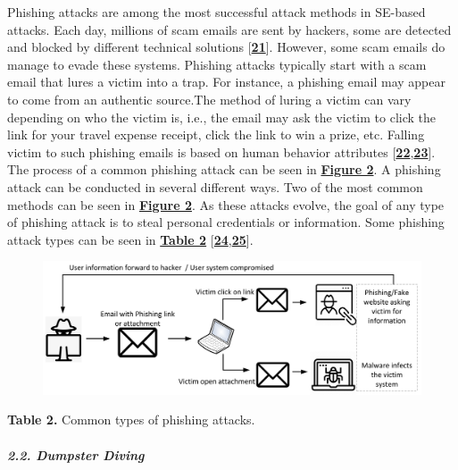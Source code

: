 Phishing attacks are among the most successful attack methods in SE-based attacks. Each day, millions of scam emails are sent by hackers, some are detected and blocked by different technical solutions [\href{https://www.mdpi.com/2076-3417/12/12/6042\#B21-applsci-12-06042}{\textbf{21}}]. However, some scam emails do manage to evade these systems. Phishing attacks typically start with a scam email that lures a victim into a trap. For instance, a phishing email may appear to come from an authentic source.The method of luring a victim can vary depending on who the victim is, i.e., the email may ask the victim to click the link for your travel expense receipt, click the link to win a prize, etc. Falling victim to such phishing emails is based on human behavior attributes [\href{https://www.mdpi.com/2076-3417/12/12/6042\#B22-applsci-12-06042}{\textbf{22}},\href{https://www.mdpi.com/2076-3417/12/12/6042\#B23-applsci-12-06042}{\textbf{23}}]. The process of a common phishing attack can be seen in \href{https://www.mdpi.com/2076-3417/12/12/6042\#fig_body_display_applsci-12-06042-f002}{\textbf{Figure 2}}. A phishing attack can be conducted in several different ways. Two of the most common methods can be seen in \href{https://www.mdpi.com/2076-3417/12/12/6042\#fig_body_display_applsci-12-06042-f002}{\textbf{Figure 2}}. As these attacks evolve, the goal of any type of phishing attack is to steal personal credentials or information. Some phishing attack types can be seen in \href{https://www.mdpi.com/2076-3417/12/12/6042\#table_body_display_applsci-12-06042-t002}{\textbf{Table 2}} [\href{https://www.mdpi.com/2076-3417/12/12/6042\#B24-applsci-12-06042}{\textbf{24}},\href{https://www.mdpi.com/2076-3417/12/12/6042\#B25-applsci-12-06042}{\textbf{25}}].
\begin{figure}
    \justifying
    \includegraphics[width=0.75\linewidth]{phishingflow.png}
    \label{fig:placeholder}
\end{figure}
\textbf{Table 2.} Common types of phishing attacks.
 
\paragraph{\textit{2.2. Dumpster Diving}}

